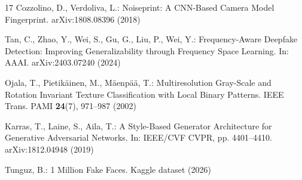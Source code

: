 \documentclass[runningheads]{llncs}
\begin{document}
\begin{thebibliography}{17}
Cozzolino, D., Verdoliva, L.:
Noiseprint: A CNN-Based Camera Model Fingerprint.
arXiv:1808.08396 (2018)

Tan, C., Zhao, Y., Wei, S., Gu, G., Liu, P., Wei, Y.:
Frequency-Aware Deepfake Detection: Improving Generalizability through Frequency Space Learning.
In: AAAI. arXiv:2403.07240 (2024)

Ojala, T., Pietik\"{a}inen, M., M\"{a}enp\"{a}\"{a}, T.:
Multiresolution Gray-Scale and Rotation Invariant Texture Classification with Local Binary Patterns.
IEEE Trans. PAMI \textbf{24}(7), 971--987 (2002)

Karras, T., Laine, S., Aila, T.:
A Style-Based Generator Architecture for Generative Adversarial Networks.
In: IEEE/CVF CVPR, pp. 4401--4410. arXiv:1812.04948 (2019)

Tunguz, B.:
1 Million Fake Faces. Kaggle dataset (2026)

\end{thebibliography}
\end{document}
